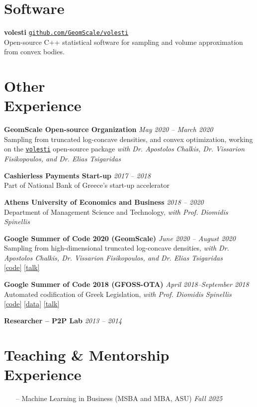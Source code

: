\documentclass[margin]{res}
\newcommand{\field}[2]{\noindent \textbf{#1} \hfill #2 \\}
\newcommand{\specialurl}[2]{\href {#2} {{{[#1]}}}}
\newcommand{\code}[1]{\specialurl {code} {#1}}
\newcommand{\data}[1]{\specialurl {data} {#1}}
\newcommand{\talk}[1]{\specialurl {talk} {#1}}
\begin{document}
\begin{resume}
\section{Software} \field{volesti}{\href{https://github.com/GeomScale/volesti}{\texttt{github.com/GeomScale/volesti}}}{Open-source C++ statistical software for sampling and volume approximation from convex bodies.}



\section{Other \\ Experience}


\field{GeomScale Open-source Organization}{\emph{May 2020 -- March 2020}}{Sampling from truncated log-concave densities, and convex optimization, working on the \href{https://github.com/GeomScale/volesti}{\texttt{volesti}} open-source package \emph{with Dr. Apostolos Chalkis, Dr. Vissarion Fisikopoulos, and Dr. Elias Tsigaridas}}

\field{Cashierless Payments Start-up}{\emph{2017 -- 2018}}{Part of National Bank of Greece's start-up accelerator}

\field{Athens University of Economics and Business}{\emph{2018 -- 2020}}{Department of Management Science and Technology, \emph{with Prof. Diomidis Spinellis}}

\field{Google Summer of Code 2020 (GeomScale)}{\emph{June 2020 -- August 2020}}{{Sampling from high-dimensional truncated log-concave densities, \emph{with Dr. Apostolos Chalkis, Dr. Vissarion Fisikopoulos, and Dr. Elias Tsigaridas}} \\ \code{https://GeomScale/volesti} \talk{https://www.youtube.com/watch?v=P7YfC8Nn6sY}}

\field{Google Summer of Code 2018 (GFOSS-OTA)}{\emph{April 2018--September 2018}}{Automated codification of Greek Legislation, \emph{with Prof. Diomidis Spinellis} \\ \code{https://github.com/eellak/gsoc2018-3gm} \data{https://archive.org/details/greekgovernmentgazette} \talk{https://www.youtube.com/watch?v=_UIGsy85Ehw}}


\field{Researcher -- P2P Lab}{\emph{2013 -- 2014}}{}



\section{Teaching \& Mentorship \\ Experience} 
\begin{itemize}[nosep]
	\item[--] Machine Learning in Business (MSBA and MBA, ASU) \hfill \emph{Fall 2025}
	

\end{itemize}
\end{resume}
\end{document}
